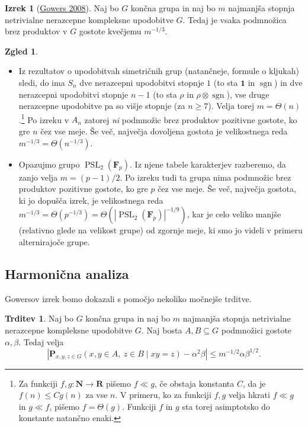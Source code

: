 \documentclass[11pt]{book}
\def\NN{\mathbf{N}}
\def\RR{\mathbf{R}}
\def\oneone{\mathbf{1}}
\def\FF{\mathbf{F}}
\def\PP{\mathbf{P}}
\DeclareMathOperator\sgn{sgn}
\DeclareMathOperator\PSL{PSL}
\theoremstyle{definition}
\theoremstyle{zgled}
\newtheorem{zgled}[theorem]{Zgled}
\theoremstyle{zgledbrezstevilke}
\theoremstyle{odprtproblem}
\theoremstyle{domacanaloga}
\theoremstyle{izrek}
\newtheorem{izrek}[theorem]{Izrek}
\newtheorem{trditev}[theorem]{Trditev}
\begin{document}
\begin{izrek}[\href{https://www.cambridge.org/core/journals/combinatorics-probability-and-computing/article/abs/quasirandom-groups/A885920D04E04BC63766C052C666931A}{Gowers 2008}]
Naj bo $G$ končna grupa in naj bo $m$ najmanjša stopnja netrivialne nerazcepne kompleksne upodobitve $G$. Tedaj je vsaka podmnožica brez produktov v $G$ gostote kvečjemu $m^{-1/3}$.
\end{izrek}

\begin{zgled} \leavevmode
\begin{itemize}
    \item Iz rezultatov o upodobitvah simetričnih grup (natančneje, formule o kljukah) sledi, do ima $S_n$ dve nerazcepni upodobitvi stopnje $1$ (to sta $\oneone$ in $\sgn$) in dve nerazcepni upodobitvi stopnje $n-1$ (to sta $\rho$ in $\rho \otimes \sgn$), vse druge nerazcepne upodobitve pa so višje stopnje (za $n \geq 7$). Velja torej $m = \Theta(n)$.\footnote{Za funkciji $f, g \colon \NN \to \RR$ pišemo $f \ll g$, če obstaja konstanta $C$, da je $f(n) \leq C g(n)$ za vse $n$. V primeru, ko za funkciji $f,g$ velja hkrati $f \ll g$ in $g \ll f$, pišemo $f = \Theta(g)$. Funkciji $f$ in $g$ sta torej asimptotsko do konstante natančno enaki.} Po izreku v $A_n$ zatorej \emph{ni} podmnožic brez produktov pozitivne gostote, ko gre $n$ čez vse meje. Še več, največja dovoljena gostota je velikostnega reda $m^{-1/3} = \Theta(n^{-1/3})$.

    \item Opazujmo grupo $\PSL_2(\FF_p)$. Iz njene tabele karakterjev razberemo, da zanjo velja $m = (p-1)/2$. Po izreku tudi ta grupa nima podmnožic brez produktov pozitivne gostote, ko gre $p$ čez vse meje. Še več, največja gostota, ki jo dopušča izrek, je velikostnega reda $m^{-1/3} = \Theta(p^{-1/3}) = \Theta(|\PSL_2(\FF_p)|^{-1/9})$, kar je celo veliko manjše (relativno glede na velikost grupe) od zgornje meje, ki smo jo videli v primeru alternirajoče grupe.
\end{itemize}
\end{zgled}

\subsection{Harmonična analiza}

Gowersov izrek bomo dokazali s pomočjo nekoliko močnejše trditve.

\begin{trditev}
Naj bo $G$ končna grupa in naj bo $m$ najmanjša stopnja netrivialne nerazcepne kompleksne upodobitve $G$. Naj bosta $A,B \subseteq G$ podmnožici gostote $\alpha, \beta$. Tedaj velja
\[
    \left| 
        \PP_{x,y,z \in G}(x,y \in A, \ z \in B \mid xy = z) - \alpha^2 \beta
    \right| 
    \leq
    m^{-1/2} \alpha \beta^{1/2}.
\]
\end{trditev}
\end{document}
